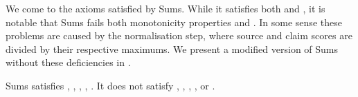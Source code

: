 We come to the axioms satisfied by Sums. While it satisfies both
\claimcoherence{} and \sourcecoherence{}, it is notable that Sums fails both
monotonicity properties and \disjointindependence{}. In some sense these
problems are caused by the normalisation step, where source and claim scores
are divided by their respective maximums. We present a modified version of Sums
without these deficiencies in .

\begin{theorem}
    Sums satisfies \claimcoherence{}, \sourcecoherence{}, \symmetry{},
    \marginaltrustworthiness{}, \trustbasedmon{}. It does not satisfy
    \freshposresp{}, \sourceposresp{}, \classicalindependence{},
    \disjointindependence{}, \conflictcoherence{} or \anticoherence{}.
\end{theorem}

